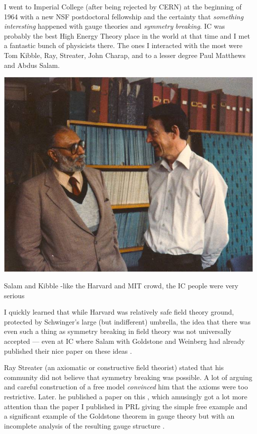 \documentclass[letterpaper,twoside,preprintnumbers,slac_one]{revtex4}
\begin{document}
I went to Imperial College (after being rejected by CERN) at the
beginning of 1964 with a new NSF postdoctoral fellowship and the
certainty that \emph{something} \emph{interesting} happened with
gauge theories and \emph{symmetry} \emph{breaking}. IC was probably
the best High Energy Theory place in the world at that time and I met
a fantastic bunch of physicists there. The ones I interacted with the
most were Tom Kibble, Ray, Streater, John Charap, and to a lesser
degree Paul Matthews and Abdus Salam.

\begin{center}
  \includegraphics[scale=0.6]{sk.jpg}

  Salam and Kibble -like the Harvard and MIT crowd, the IC people were very serious
\end{center}


I quickly learned that while Harvard was relatively safe field theory
ground, protected by Schwinger's large (but indifferent) umbrella, the
idea that there was even such a thing as symmetry breaking in field
theory was not universally accepted --- even at IC where Salam
with Goldstone and Weinberg had already published their nice paper on
these ideas \cite{gsw;1962}.

Ray Streater (an axiomatic or constructive field theorist) stated that
his community did not believe that symmetry breaking was possible. A
lot of arguing and careful construction of a free model
\emph{convinced} him that the axioms were too restrictive. Later. he
published a paper on this \cite{rs;1965}, which amusingly got a lot more attention
than the paper I published in PRL giving the simple free example and a
significant example of the Goldstone theorem in gauge theory but  with
an incomplete analysis of the resulting gauge structure \cite{ggfu;1964}.
\end{document}
